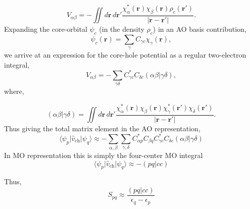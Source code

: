 \documentclass[11pt]{article}
\begin{document}
\begin{equation}
  V_{\alpha\beta}
  =
  -\iint d\mathbf r\,d\mathbf r'
  \frac{
  \chi_\alpha^{*}(\mathbf r)
  \chi_\beta(\mathbf r)
  \rho_c(\mathbf r')
  }
  {|\mathbf r-\mathbf r'|}.
  \label{eq:core_hole_ao_integral}
\end{equation}
Expanding the core-orbital $\psi_c$ (in the density $\rho_c$) in an AO basis contribution,
\begin{equation}
  \psi_{c}(\mathbf r)
  =
  \sum_{\gamma}
  C_{\gamma c}\chi_\gamma(\mathbf r),
\end{equation}
we arrive at an expression for the core-hole potential as a regular two-electron integral, 
\begin{equation}
  V_{\alpha\beta}
  =
  -
  \sum_{\gamma\delta}
  C_{\gamma c}^{*}
  C_{\delta c}
  (\alpha\beta|\gamma\delta),
  \label{eq:core_hole_eri}
\end{equation}
where,

\begin{equation}
  (\alpha\beta|\gamma\delta)
  =
  \iint d\mathbf r\,d\mathbf r'
  \frac{
  \chi_\alpha^*(\mathbf r)
  \chi_\beta(\mathbf r)
  \chi_\gamma^*(\mathbf r')
  \chi_\delta(\mathbf r')
  }
  {|\mathbf r-\mathbf r'|}.
\end{equation}
Thus giving the total matrix element in the AO representation,
\begin{equation}
  \boxed{
  \langle \psi_p|\hat{v}_{\mathrm{ch}}|\psi_q\rangle
  \approx
  -
  \sum_{\alpha,\beta}
  \sum_{\gamma,\delta}
  C_{\alpha p}^{*}
  C_{\beta q}
  C_{\gamma c}^{*}
  C_{\delta c}
  (\alpha\beta|\gamma\delta)
  }
  \label{eq:core_hole_final}
\end{equation}
%
In MO representation this is simply the four-center MO integral
\begin{equation}
    \boxed{
  \langle \psi_p|\hat{v}_{\mathrm{ch}}|\psi_q\rangle
  \approx
  -(p q | c c)
  }
\end{equation}

Thus,
\begin{equation}
    S_{pq} \approx \frac{(pq|cc)}{\epsilon_q - \epsilon_p}
\end{equation}
\end{document}

